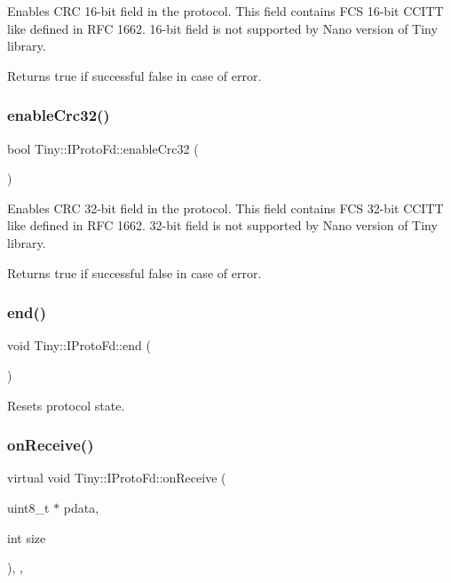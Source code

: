 Enables C\+RC 16-\/bit field in the protocol. This field contains F\+CS 16-\/bit C\+C\+I\+TT like defined in R\+FC 1662. 16-\/bit field is not supported by Nano version of Tiny library. \begin{DoxyReturn}{Returns}
true if successful false in case of error. 
\end{DoxyReturn}
\mbox{\label{classTiny_1_1IProtoFd_a1bf1f5211ae3a49caf73ee3de3bb9247}} 
\subsubsection{\texorpdfstring{enable\+Crc32()}{enableCrc32()}}
{\footnotesize\ttfamily bool Tiny\+::\+I\+Proto\+Fd\+::enable\+Crc32 (\begin{DoxyParamCaption}{ }\end{DoxyParamCaption})}

Enables C\+RC 32-\/bit field in the protocol. This field contains F\+CS 32-\/bit C\+C\+I\+TT like defined in R\+FC 1662. 32-\/bit field is not supported by Nano version of Tiny library. \begin{DoxyReturn}{Returns}
true if successful false in case of error. 
\end{DoxyReturn}
\mbox{\label{classTiny_1_1IProtoFd_ad17e76d0ef7ea40838e51acc2498c482}} 
\subsubsection{\texorpdfstring{end()}{end()}}
{\footnotesize\ttfamily void Tiny\+::\+I\+Proto\+Fd\+::end (\begin{DoxyParamCaption}{ }\end{DoxyParamCaption})}

Resets protocol state. \mbox{\label{classTiny_1_1IProtoFd_a795b41c969708964cd4646580af1c3ab}} 
\subsubsection{\texorpdfstring{on\+Receive()}{onReceive()}}
{\footnotesize\ttfamily virtual void Tiny\+::\+I\+Proto\+Fd\+::on\+Receive (\begin{DoxyParamCaption}\item[{uint8\+\_\+t $\ast$}]{pdata,  }\item[{int}]{size }\end{DoxyParamCaption})\hspace{0.3cm}{\ttfamily [inline]}, {\ttfamily [protected]}, {\ttfamily [virtual]}}

